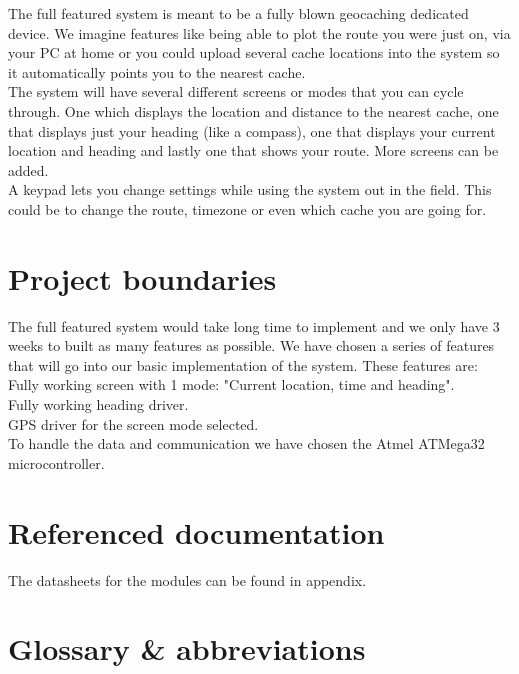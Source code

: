 The full featured system is meant to be a fully blown geocaching dedicated device. We imagine features like being able to plot the route you were just on, via your PC at home or you could upload several cache locations into the system so it automatically points you to the nearest cache.\\
The system will have several different screens or modes that you can cycle through. One which displays the location and distance to the nearest cache, one that displays just your heading (like a compass), one that displays your current location and heading and lastly one that shows your route. More screens can be added. \\
A keypad lets you change settings while using the system out in the field. This could be to change the route, timezone or even which cache you are going for.\\

\section{Project boundaries}
The full featured system would take long time to implement and we only have 3 weeks to built as many features as possible. We have chosen a series of features that will go into our basic implementation of the system. These features are:
Fully working screen with 1 mode: "Current location, time and heading".\\
Fully working heading driver.\\
GPS driver for the screen mode selected. \\
To handle the data and communication we have chosen the Atmel ATMega32 microcontroller.\\

\section{Referenced documentation}
The datasheets for the modules can be found in appendix.

\section{Glossary \& abbreviations}







